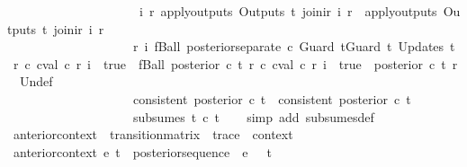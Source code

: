 \begin{isabellebody}
\ \ \ \ \ \ \ \ \ \ \ \ \ \ \ \ \ \ \ \ {\isacharparenleft}{\isasymexists}\ i\ r{\isachardot}\ apply{\isacharunderscore}outputs\ {\isacharparenleft}Outputs\ t{}{\isacharparenright}\ {\isacharparenleft}join{\isacharunderscore}ir\ i\ r{\isacharparenright}\ {\isacharequal}\ apply{\isacharunderscore}outputs\ {\isacharparenleft}Outputs\ t{}{\isacharparenright}\ {\isacharparenleft}join{\isacharunderscore}ir\ i\ r{\isacharparenright}{\isacharparenright}\ {\isasymLongrightarrow}\isanewline
\ \ \ \ \ \ \ \ \ \ \ \ \ \ \ \ \ \ \ \ {\isacharparenleft}{\isasymforall}r\ i{\isachardot}\ fBall\ {\isacharparenleft}posterior{\isacharunderscore}separate\ c\ {\isacharparenleft}Guard\ t{}{\isacharat}Guard\ t{}{\isacharparenright}\ {\isacharparenleft}Updates\ t{}{\isacharparenright}\ r{\isacharparenright}\ {\isacharparenleft}{\isasymlambda}c{\isachardot}\ cval\ c\ r\ i\ {\isacharequal}\ true{\isacharparenright}\ {\isasymlongrightarrow}\ fBall\ {\isacharparenleft}posterior\ c\ t{}\ r{\isacharparenright}\ {\isacharparenleft}{\isasymlambda}c{\isachardot}\ cval\ c\ r\ i\ {\isacharequal}\ true{\isacharparenright}\ {\isasymor}\ {\isacharparenleft}posterior\ c\ t{}\ r{\isacharparenright}\ {\isacharequal}\ {\isacharbraceleft}{\isacharbar}Undef{\isacharbar}{\isacharbraceright}{\isacharparenright}\ {\isasymLongrightarrow}\isanewline
\ \ \ \ \ \ \ \ \ \ \ \ \ \ \ \ \ \ \ \ {\isacharparenleft}consistent\ {\isacharparenleft}posterior\ c\ t{}{\isacharparenright}\ {\isasymlongrightarrow}\ consistent\ {\isacharparenleft}posterior\ c\ t{}{\isacharparenright}{\isacharparenright}\ {\isasymLongrightarrow}\isanewline
\ \ \ \ \ \ \ \ \ \ \ \ \ \ \ \ \ \ \ \ subsumes\ t{}\ c\ t{}{\isachardoublequoteclose}\isanewline
%
\isadelimproof
\ \ %
\endisadelimproof
%
\isatagproof
{}\isamarkupfalse%
\ {\isacharparenleft}simp\ add{\isacharcolon}\ subsumes{\isacharunderscore}def{\isacharparenright}%
\endisatagproof
{\isafoldproof}%
%
\isadelimproof
\isanewline
%
\endisadelimproof
\isanewline
{}\isamarkupfalse%
\ anterior{\isacharunderscore}context\ {\isacharcolon}{\isacharcolon}\ {\isachardoublequoteopen}transition{\isacharunderscore}matrix\ {\isasymRightarrow}\ trace\ {\isasymRightarrow}\ context{\isachardoublequoteclose}\ \isanewline
\ {\isachardoublequoteopen}anterior{\isacharunderscore}context\ e\ t\ {\isacharequal}\ posterior{\isacharunderscore}sequence\ {\isasymlbrakk}{\isasymrbrakk}\ e\ {}\ {\isacharless}{\isachargreater}\ t{\isachardoublequoteclose}\isanewline

\end{isabellebody}
